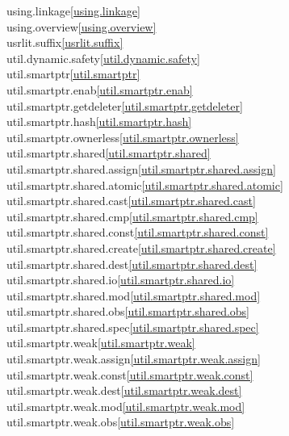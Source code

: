 \begin{multicols}{2}
using.linkage\quad\ref{using.linkage}\\
using.overview\quad\ref{using.overview}\\
usrlit.suffix\quad\ref{usrlit.suffix}\\
util.dynamic.safety\quad\ref{util.dynamic.safety}\\
util.smartptr\quad\ref{util.smartptr}\\
util.smartptr.enab\quad\ref{util.smartptr.enab}\\
util.smartptr.getdeleter\quad\ref{util.smartptr.getdeleter}\\
util.smartptr.hash\quad\ref{util.smartptr.hash}\\
util.smartptr.ownerless\quad\ref{util.smartptr.ownerless}\\
util.smartptr.shared\quad\ref{util.smartptr.shared}\\
util.smartptr.shared.assign\quad\ref{util.smartptr.shared.assign}\\
util.smartptr.shared.atomic\quad\ref{util.smartptr.shared.atomic}\\
util.smartptr.shared.cast\quad\ref{util.smartptr.shared.cast}\\
util.smartptr.shared.cmp\quad\ref{util.smartptr.shared.cmp}\\
util.smartptr.shared.const\quad\ref{util.smartptr.shared.const}\\
util.smartptr.shared.create\quad\ref{util.smartptr.shared.create}\\
util.smartptr.shared.dest\quad\ref{util.smartptr.shared.dest}\\
util.smartptr.shared.io\quad\ref{util.smartptr.shared.io}\\
util.smartptr.shared.mod\quad\ref{util.smartptr.shared.mod}\\
util.smartptr.shared.obs\quad\ref{util.smartptr.shared.obs}\\
util.smartptr.shared.spec\quad\ref{util.smartptr.shared.spec}\\
util.smartptr.weak\quad\ref{util.smartptr.weak}\\
util.smartptr.weak.assign\quad\ref{util.smartptr.weak.assign}\\
util.smartptr.weak.const\quad\ref{util.smartptr.weak.const}\\
util.smartptr.weak.dest\quad\ref{util.smartptr.weak.dest}\\
util.smartptr.weak.mod\quad\ref{util.smartptr.weak.mod}\\
util.smartptr.weak.obs\quad\ref{util.smartptr.weak.obs}\\

\end{multicols}
